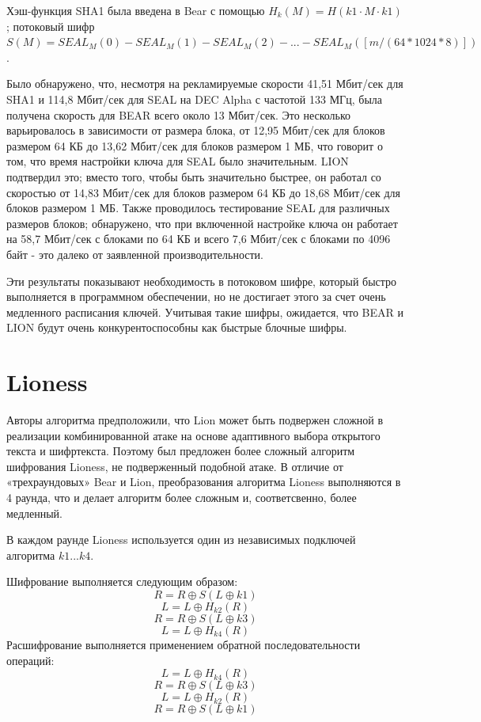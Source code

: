\documentclass[12pt]{article}
\begin{document}
Хэш-функция SHA1 была введена в Bear с помощью $H_{k}(M) = {H(k1\cdot M \cdot k1)}$; потоковый шифр $S(M) = SEAL_{M}(0) - SEAL_{M}(1) - SEAL_{M}(2) - ... - SEAL_{M}([m/(64*1024*8)])$.

Было обнаружено, что, несмотря на рекламируемые скорости 41,51 Мбит/сек для SHA1 и 114,8 Мбит/сек для SEAL на DEC Alpha с частотой 133 МГц, была получена скорость для BEAR всего около 13 Мбит/сек. Это несколько варьировалось в зависимости от размера блока, от 12,95 Мбит/сек для блоков размером 64 КБ до 13,62 Мбит/сек для блоков размером 1 МБ, что говорит о том, что время настройки ключа для SEAL было значительным. LION подтвердил это; вместо того, чтобы быть значительно быстрее, он работал со скоростью от 14,83 Мбит/сек для блоков размером 64 КБ до 18,68 Мбит/сек для блоков размером 1 МБ. Также проводилось тестирование SEAL для различных размеров блоков; обнаружено, что при включенной настройке ключа он работает на 58,7 Мбит/сек с блоками по 64 КБ и всего 7,6 Мбит/сек с блоками по 4096 байт - это далеко от заявленной производительности.

Эти результаты показывают необходимость в потоковом шифре, который быстро выполняется в программном
обеспечении, но не достигает этого за счет очень медленного расписания ключей. Учитывая такие шифры, ожидается, что BEAR и LION будут очень конкурентоспособны как быстрые блочные шифры.

\section{Lioness}

Авторы алгоритма предположили, что Lion может быть подвержен сложной в реализации комбинированной атаке на основе адаптивного выбора открытого текста и шифртекста. Поэтому был предложен более сложный алгоритм шифрования Lioness, не подверженный подобной атаке. В отличие от «трехраундовых» Bear и Lion, преобразования алгоритма
Lioness выполняются в 4 раунда, что и делает алгоритм более сложным и, соответсвенно, более медленный.

В каждом раунде Lioness используется один из независимых подключей алгоритма $k1...k4$. 

Шифрование выполняется следующим образом:
\[R = R\oplus S(L\oplus k1)\]
\[L = L\oplus H_{k2}(R)\]
\[R = R\oplus S(L\oplus k3)\]
\[L = L\oplus H_{k4}(R)\]
\newpage
Расшифрование выполняется применением обратной последовательности операций:
\[L = L\oplus H_{k4}(R)\]
\[R = R\oplus S(L\oplus k3)\]
\[L = L\oplus H_{k2}(R)\]
\[R = R\oplus S(L\oplus k1)\]
\end{document}
